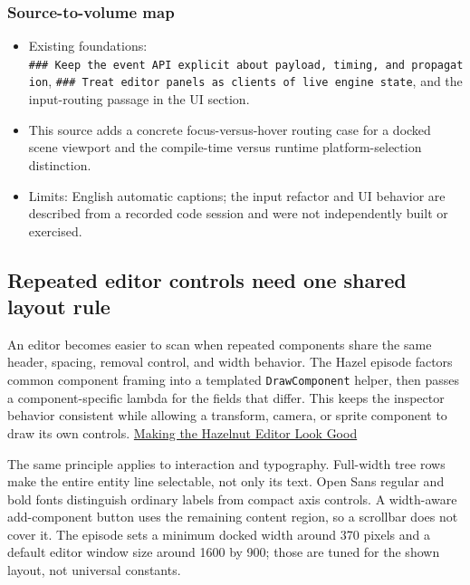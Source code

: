 \subsubsection{Source-to-volume map}\label{06-engine-ii-ch032-source-to-volume-map-2}

\hypertarget{06-engine-ii-ch032-source-to-volume-map-2}{}

\begin{itemize}
\tightlist
\item
  Existing foundations: \texttt{\#\#\#\ Keep\ the\ event\ API\ explicit\ about\ payload,\ timing,\ and\ propagation}, \texttt{\#\#\#\ Treat\ editor\ panels\ as\ clients\ of\ live\ engine\ state}, and the input-routing passage in the UI section.
\item
  This source adds a concrete focus-versus-hover routing case for a docked scene viewport and the compile-time versus runtime platform-selection distinction.
\item
  Limits: English automatic captions; the input refactor and UI behavior are described from a recorded code session and were not independently built or exercised.
\end{itemize}

\subsection{Repeated editor controls need one shared layout rule}\label{06-engine-ii-ch032-repeated-editor-controls-need-one-shared-layout-rule}

\hypertarget{06-engine-ii-ch032-repeated-editor-controls-need-one-shared-layout-rule}{}

An editor becomes easier to scan when repeated components share the same header, spacing, removal control, and width behavior. The Hazel episode factors common component framing into a templated \texttt{DrawComponent} helper, then passes a component-specific lambda for the fields that differ. This keeps the inspector behavior consistent while allowing a transform, camera, or sprite component to draw its own controls. \href{https://www.youtube.com/watch?v=oESRecjuLNY}{Making the Hazelnut Editor Look Good}

The same principle applies to interaction and typography. Full-width tree rows make the entire entity line selectable, not only its text. Open Sans regular and bold fonts distinguish ordinary labels from compact axis controls. A width-aware add-component button uses the remaining content region, so a scrollbar does not cover it. The episode sets a minimum docked width around 370 pixels and a default editor window size around 1600 by 900; those are tuned for the shown layout, not universal constants.

